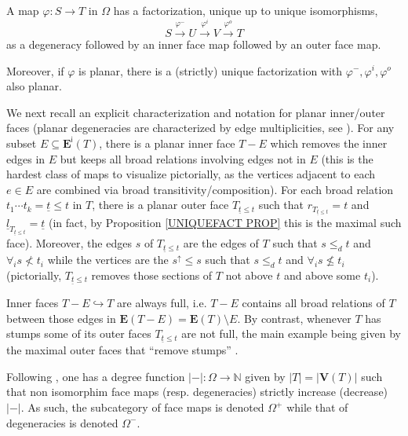 \documentclass[a4paper,10pt
,draft
]{article}%
\begin{document}
\begin{proposition}\label{UNIQUEFACT PROP}
	A map $\varphi \colon S \to T$ in $\Omega$ has a factorization, unique up to unique isomorphisms,
\[
	S \xrightarrow{\varphi^{-}}
	U \xrightarrow{\varphi^{i}}
	V \xrightarrow{\varphi^{o}}
	T	
\]
as a degeneracy followed by an inner face map followed by an outer face map.

Moreover, if $\varphi$ is planar, there is a (strictly) unique factorization with $\varphi^{-},\varphi^i,\varphi^o$ also planar. 
\end{proposition}

We next recall an explicit characterization and notation for planar inner/outer faces
(planar degeneracies are characterized by edge multiplicities, see \cite[Prop. 3.47(ii)]{BP17}).
For any subset $E \subseteq \boldsymbol{E}^{\mathsf{i}}(T)$, there is a planar inner face
$T-E$ which removes the inner edges in $E$ but keeps all broad relations involving edges not in $E$
(this is the hardest class of maps to visualize pictorially, as the vertices adjacent to each $e \in E$ are combined via broad transitivity/composition).
For each broad relation
$t_1 \cdots t_k = \underline{t} \leq t$ in $T$,
there is a planar outer face
$T_{\underline{t} \leq t}$
such that
$r_{T_{\underline{t} \leq t}} = t$ and
$\underline{l}_{T_{\underline{t} \leq t}} = \underline{t}$
(in fact, by Proposition \ref{UNIQUEFACT PROP} this is the maximal such face).
Moreover, the edges $s$ of $T_{\underline{t} \leq t}$ are the edges of $T$ such that
$s \leq_d t$ and $\forall_{i} s \not < t_i$ while the vertices are the $s^{\uparrow} \leq s$ such that 
$s \leq_d t$ and $\forall_{i} s \not \leq t_i$ 
(pictorially, $T_{\underline{t} \leq t}$ removes those sections of $T$ not above $t$ and above some $t_i$).


\begin{remark}\label{INNFULL REM}
	Inner faces $T-E \hookrightarrow T$ are always full, i.e. $T-E$ contains all broad relations of $T$ between those edges in 
$\boldsymbol{E}(T-E) = \boldsymbol{E}(T) \setminus E$.
	By contrast, whenever $T$ has stumps some of its outer faces $T_{\underline{t} \leq t}$ are not full,
	the main example being given by the maximal outer faces
	that ``remove stumps'' \cite[Not. 5.41]{Per18}.
\end{remark}


\begin{remark}\label{DEGREE REM}
	Following \cite[Ex. 2.8]{BM11}, one has a degree function 
	$|-|\colon \Omega \to \mathbb{N}$ given by $|T|=|\boldsymbol{V}(T)|$
	such that non isomorphim face maps (resp. degeneracies) strictly increase (decrease) $|-|$.
	As such, the subcategory of face maps is denoted $\Omega^+$ while that of degeneracies is denoted $\Omega^-$.
\end{remark}
\end{document}
